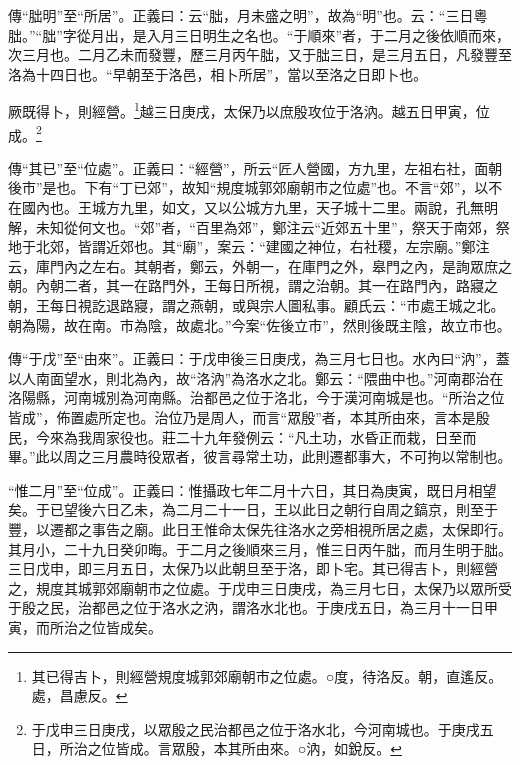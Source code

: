 {\noindent\zhuan{}\fzbyks 傳“朏明”至“所居”。正義曰：云“朏，月未盛之明”，故為“明”也。云：“三日粵朏。”“朏”字從月出，是入月三日明生之名也。“于順來”者，于二月之後依順而來，次三月也。二月乙未而發豐，歷三月丙午朏，又于朏三日，是三月五日，凡發豐至洛為十四日也。“早朝至于洛邑，相卜所居”，當以至洛之日即卜也。 \par}

厥既得卜，則經營。\footnote{其已得吉卜，則經營規度城郭郊廟朝市之位處。○度，待洛反。朝，直遙反。處，昌慮反。}越三日庚戌，太保乃以庶殷攻位于洛汭。越五日甲寅，位成。\footnote{于戊申三日庚戌，以眾殷之民治都邑之位于洛水北，今河南城也。于庚戌五日，所治之位皆成。言眾殷，本其所由來。○汭，如銳反。}

{\noindent\zhuan{}\fzbyks 傳“其已”至“位處”。正義曰：“經營”，所云“匠人營國，方九里，左祖右社，面朝後市”是也。下有“丁已郊”，故知“規度城郭郊廟朝市之位處”也。不言“郊”，以不在國內也。王城方九里，如文，又以公城方九里，天子城十二里。兩說，孔無明解，未知從何文也。“郊”者，“百里為郊”，鄭注云“近郊五十里”，祭天于南郊，祭地于北郊，皆謂近郊也。其“廟”，案云：“建國之神位，右社稷，左宗廟。”鄭注云，庫門內之左右。其朝者，鄭云，外朝一，在庫門之外，皋門之內，是詢眾庶之朝。內朝二者，其一在路門外，王每日所視，謂之治朝。其一在路門內，路寢之朝，王每日視訖退路寢，謂之燕朝，或與宗人圖私事。顧氏云：“市處王城之北。朝為陽，故在南。市為陰，故處北。”今案“佐後立市”，然則後既主陰，故立市也。 \par}

{\noindent\zhuan{}\fzbyks 傳“于戊”至“由來”。正義曰：于戊申後三日庚戌，為三月七日也。水內曰“汭”，蓋以人南面望水，則北為內，故“洛汭”為洛水之北。鄭云：“隈曲中也。”河南郡治在洛陽縣，河南城別為河南縣。治都邑之位于洛北，今于漢河南城是也。“所治之位皆成”，佈置處所定也。治位乃是周人，而言“眾殷”者，本其所由來，言本是殷民，今來為我周家役也。莊二十九年發例云：“凡土功，水昏正而栽，日至而畢。”此以周之三月農時役眾者，彼言尋常土功，此則遷都事大，不可拘以常制也。 \par}

{\noindent\shu{}\fzkt “惟二月”至“位成”。正義曰：惟攝政七年二月十六日，其日為庚寅，既日月相望矣。于已望後六日乙未，為二月二十一日，王以此日之朝行自周之鎬京，則至于豐，以遷都之事告之廟。此日王惟命太保先往洛水之旁相視所居之處，太保即行。其月小，二十九日癸卯晦。于二月之後順來三月，惟三日丙午朏，而月生明于朏。三日戊申，即三月五日，太保乃以此朝旦至于洛，即卜宅。其已得吉卜，則經營之，規度其城郭郊廟朝市之位處。于戊申三日庚戌，為三月七日，太保乃以眾所受于殷之民，治都邑之位于洛水之汭，謂洛水北也。于庚戌五日，為三月十一日甲寅，而所治之位皆成矣。 \par}

